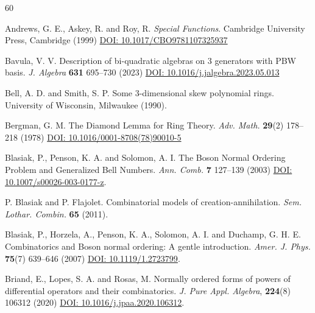 \documentclass{amsart}
\theoremstyle{definition}
\theoremstyle{remark}
\numberwithin{equation}{section}
\begin{document}
\begin{thebibliography}{60}

 Andrews, G. E., Askey, R. and Roy, R. {\em Special Functions}. Cambridge University Press, Cambridge (1999) \href{https://doi.org/10.1017/CBO9781107325937}{DOI: 10.1017/CBO9781107325937}


 Bavula, V. V. Description of bi-quadratic algebras on 3 generators with PBW basis. {\em J. Algebra} {\bf 631} 695--730 (2023) \href{https://doi.org/10.1016/j.jalgebra.2023.05.013}{DOI: 10.1016/j.jalgebra.2023.05.013}


 Bell, A. D. and Smith, S. P. Some 3-dimensional skew polynomial rings. University of Wisconsin, Milwaukee (1990).

 Bergman, G. M. The Diamond Lemma for Ring Theory. {\em Adv. Math.} {\bf 29}(2) 178--218 (1978)  \href{https://doi.org/10.1016/0001-8708(78)90010-5}{DOI: 10.1016/0001-8708(78)90010-5}

 Blasiak, P., Penson, K. A. and Solomon, A. I. The Boson Normal Ordering Problem and Generalized Bell Numbers. {\em Ann. Comb.} {\bf 7} 127--139 (2003) \href{https://doi.org/10.1007/s00026-003-0177-z}{DOI: 10.1007/s00026-003-0177-z}.

 P. Blasiak and P. Flajolet. Combinatorial models of creation-annihilation. {\em Sem. Lothar. Combin.} {\bf 65} (2011).

 Blasiak, P., Horzela, A., Penson, K. A., Solomon, A. I. and Duchamp, G. H. E. Combinatorics and Boson normal ordering: A gentle introduction. {\em Amer. J. Phys.} {\bf 75}(7) 639--646 (2007)  \href{https://doi.org/10.1119/1.2723799}{DOI: 10.1119/1.2723799}.

 Briand, E., Lopes, S. A. and Rosas, M. Normally ordered forms of powers of differential operators and their combinatorics. {\em J. Pure Appl. Algebra}, {\bf 224}(8) 106312 (2020)  \href{https://doi.org/10.1016/j.jpaa.2020.106312}{DOI: 10.1016/j.jpaa.2020.106312}.


\end{thebibliography}
\end{document}
